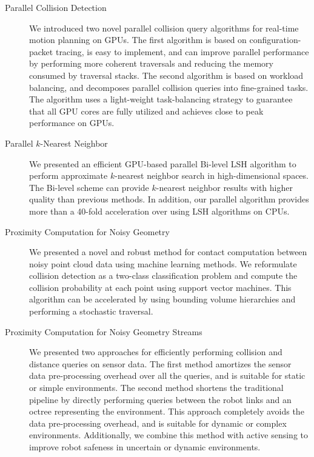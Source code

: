 \begin{description}
\item[Parallel Collision Detection] We introduced two novel parallel collision query algorithms for real-time motion planning on GPUs. The first algorithm is based on configuration-packet tracing, is easy to implement, and can improve parallel performance by performing more coherent traversals and reducing the memory consumed by traversal stacks. The second algorithm is based on workload balancing, and decomposes parallel collision queries into fine-grained tasks. The algorithm uses a light-weight task-balancing strategy to guarantee that all GPU cores are fully utilized and achieves close to peak performance on GPUs.
\item[Parallel $k$-Nearest Neighbor] We presented an efficient GPU-based parallel Bi-level LSH algorithm to perform approximate $k$-nearest neighbor search in high-dimensional spaces. The Bi-level scheme can provide $k$-nearest neighbor results with higher quality than previous methods. In addition, our parallel algorithm provides more than a 40-fold acceleration over using LSH algorithms on CPUs.
\item[Proximity Computation for Noisy Geometry] We presented a novel and robust method for contact computation between noisy point cloud data using machine learning methods. We reformulate collision detection as a two-class classification problem and compute the collision probability at each point using support vector machines. This algorithm can be accelerated by using bounding volume hierarchies and performing a stochastic traversal.
\item[Proximity Computation for Noisy Geometry Streams] We presented two approaches for efficiently performing collision and distance queries on sensor data. The first method amortizes the sensor data pre-processing overhead over all the queries, and is suitable for static or simple environments. The second method shortens the traditional pipeline by directly performing queries between the robot links and an octree representing the environment. This approach completely avoids the data pre-processing overhead, and is suitable for dynamic or complex environments. Additionally, we combine this method with active sensing to improve robot safeness in uncertain or dynamic environments.
\end{description}

